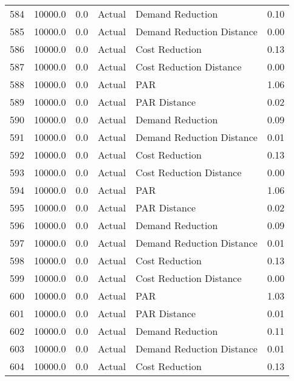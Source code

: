 \begin{longtable}{lrrllr}
584  &      10000.0 &     0.0 &         Actual &           Demand Reduction &   0.10 \\
585  &      10000.0 &     0.0 &         Actual &  Demand Reduction Distance &   0.00 \\
586  &      10000.0 &     0.0 &         Actual &             Cost Reduction &   0.13 \\
587  &      10000.0 &     0.0 &         Actual &    Cost Reduction Distance &   0.00 \\
588  &      10000.0 &     0.0 &         Actual &                        PAR &   1.06 \\
589  &      10000.0 &     0.0 &         Actual &               PAR Distance &   0.02 \\
590  &      10000.0 &     0.0 &         Actual &           Demand Reduction &   0.09 \\
591  &      10000.0 &     0.0 &         Actual &  Demand Reduction Distance &   0.01 \\
592  &      10000.0 &     0.0 &         Actual &             Cost Reduction &   0.13 \\
593  &      10000.0 &     0.0 &         Actual &    Cost Reduction Distance &   0.00 \\
594  &      10000.0 &     0.0 &         Actual &                        PAR &   1.06 \\
595  &      10000.0 &     0.0 &         Actual &               PAR Distance &   0.02 \\
596  &      10000.0 &     0.0 &         Actual &           Demand Reduction &   0.09 \\
597  &      10000.0 &     0.0 &         Actual &  Demand Reduction Distance &   0.01 \\
598  &      10000.0 &     0.0 &         Actual &             Cost Reduction &   0.13 \\
599  &      10000.0 &     0.0 &         Actual &    Cost Reduction Distance &   0.00 \\
600  &      10000.0 &     0.0 &         Actual &                        PAR &   1.03 \\
601  &      10000.0 &     0.0 &         Actual &               PAR Distance &   0.01 \\
602  &      10000.0 &     0.0 &         Actual &           Demand Reduction &   0.11 \\
603  &      10000.0 &     0.0 &         Actual &  Demand Reduction Distance &   0.01 \\
604  &      10000.0 &     0.0 &         Actual &             Cost Reduction &   0.13 \\

\end{longtable}
